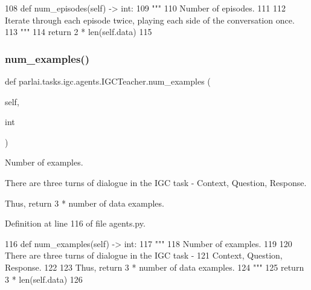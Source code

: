 \begin{DoxyCode}
108     \textcolor{keyword}{def }num\_episodes(self) -> int:
109         \textcolor{stringliteral}{"""}
110 \textcolor{stringliteral}{        Number of episodes.}
111 \textcolor{stringliteral}{}
112 \textcolor{stringliteral}{        Iterate through each episode twice, playing each side of the conversation once.}
113 \textcolor{stringliteral}{        """}
114         \textcolor{keywordflow}{return} 2 * len(self.data)
115 
\end{DoxyCode}
\mbox{\label{classparlai_1_1tasks_1_1igc_1_1agents_1_1IGCTeacher_a3039139bd8c026b410abf1852f847935}} 
\subsubsection{\texorpdfstring{num\+\_\+examples()}{num\_examples()}}
{\footnotesize\ttfamily def parlai.\+tasks.\+igc.\+agents.\+I\+G\+C\+Teacher.\+num\+\_\+examples (\begin{DoxyParamCaption}\item[{}]{self,  }\item[{}]{int }\end{DoxyParamCaption})}

\begin{DoxyVerb}Number of examples.

There are three turns of dialogue in the IGC task -
Context, Question, Response.

Thus, return 3 * number of data examples.
\end{DoxyVerb}
 

Definition at line 116 of file agents.\+py.


\begin{DoxyCode}
116     \textcolor{keyword}{def }num\_examples(self) -> int:
117         \textcolor{stringliteral}{"""}
118 \textcolor{stringliteral}{        Number of examples.}
119 \textcolor{stringliteral}{}
120 \textcolor{stringliteral}{        There are three turns of dialogue in the IGC task -}
121 \textcolor{stringliteral}{        Context, Question, Response.}
122 \textcolor{stringliteral}{}
123 \textcolor{stringliteral}{        Thus, return 3 * number of data examples.}
124 \textcolor{stringliteral}{        """}
125         \textcolor{keywordflow}{return} 3 * len(self.data)
126 
\end{DoxyCode}
\mbox{\label{classparlai_1_1tasks_1_1igc_1_1agents_1_1IGCTeacher_a9e0f104aaf5a36d0990893450c0ac135}} 
